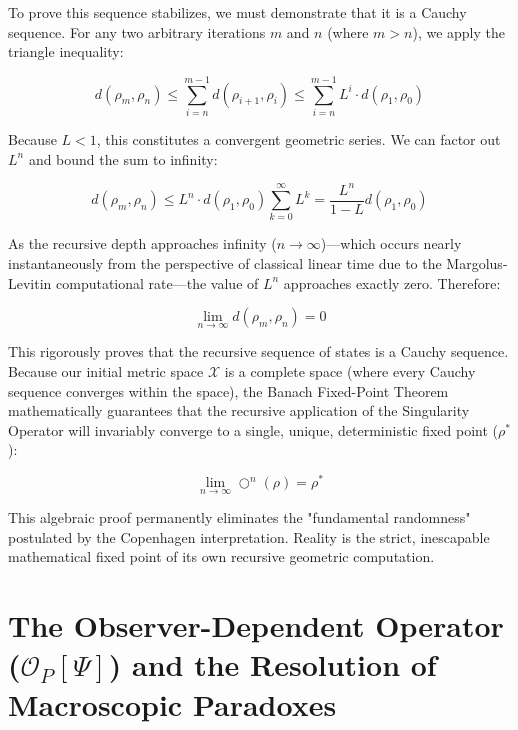 \documentclass[12pt,openany]{book}
\begin{document}
To prove this sequence stabilizes, we must demonstrate that it is a Cauchy sequence. For any two arbitrary iterations $m$ and $n$ (where $m > n$), we apply the triangle inequality:

\begin{equation}
d(\rho_m, \rho_n) \le \sum_{i=n}^{m-1} d(\rho_{i+1}, \rho_i) \le \sum_{i=n}^{m-1} L^i \cdot d(\rho_1, \rho_0)
\end{equation}

Because $L < 1$, this constitutes a convergent geometric series. We can factor out $L^n$ and bound the sum to infinity:

\begin{equation}
d(\rho_m, \rho_n) \le L^n \cdot d(\rho_1, \rho_0) \sum_{k=0}^{\infty} L^k = \frac{L^n}{1-L} d(\rho_1, \rho_0)
\end{equation}

As the recursive depth approaches infinity ($n \to \infty$)---which occurs nearly instantaneously from the perspective of classical linear time due to the Margolus-Levitin computational rate---the value of $L^n$ approaches exactly zero. Therefore:

\begin{equation}
\lim_{n \to \infty} d(\rho_m, \rho_n) = 0
\end{equation}

This rigorously proves that the recursive sequence of states is a Cauchy sequence. Because our initial metric space $\mathcal{X}$ is a complete space (where every Cauchy sequence converges within the space), the Banach Fixed-Point Theorem mathematically guarantees that the recursive application of the Singularity Operator will invariably converge to a single, unique, deterministic fixed point ($\rho^*$):

\begin{equation}
\lim_{n \to \infty} \bigcirc^n(\rho) = \rho^*
\end{equation}

This algebraic proof permanently eliminates the "fundamental randomness" postulated by the Copenhagen interpretation. Reality is the strict, inescapable mathematical fixed point of its own recursive geometric computation.

\chapter[The Observer-Dependent Operator]{The Observer-Dependent Operator ($\mathcal{O}_P[\Psi]$) and the Resolution of Macroscopic Paradoxes}
\end{document}
